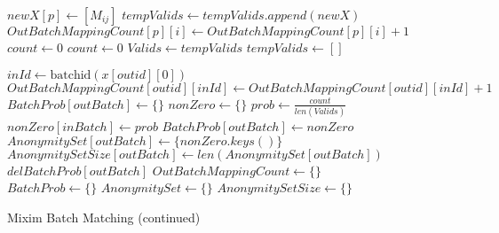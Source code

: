 \documentclass[twocolumn]{article}
\begin{document}
\begin{figure*}[p]
  \captionsetup{type=algorithm}
  \ContinuedFloat
  \caption{Mixim Batch Matching (continued)}
  \begin{algorithmic}[1]
                      \EndIf
                \EndFor
                    \State $newX [p] \gets  [M_{ij}] $
                    \State $ tempValids \gets tempValids.append(newX) $
                    \State $ OutBatchMappingCount[p][i] \gets OutBatchMappingCount[p][i] + 1 $
                    \State $count \gets 0$
                \Else
                    \State $count \gets 0$
                \EndIf
            \EndIf
        \EndFor
    \EndFor
    \State $ Valids \gets tempValids $
    \State $ tempValids \gets [] $
\EndIf

            \State $ inId \gets \text{batchid}(x[outid][0])$
            \State $ OutBatchMappingCount[outid][inId] \gets OutBatchMappingCount[outid][inId] + 1$
        \EndIf
    \EndFor
\EndFor
{}
        \State $ BatchProb[outBatch] \gets \{ \} $
    \EndIf
    \State $ nonZero \gets \{ \} $
        \State $ prob \gets \frac{count}{len(Valids)}$
            \State $ nonZero[inBatch] \gets prob $
        \EndIf
    \EndFor
        \State $ BatchProb[outBatch] \gets nonZero $
        \State $ AnonymitySet[outBatch] \gets \{ nonZero.keys() \} $
        \State $ AnonymitySetSize[outBatch] \gets len(AnonymitySet[outBatch]) $
    \Else
            \State $ del BatchProb[outBatch] $
        \EndIf
    \EndIf
\EndFor
\State $ OutBatchMappingCount \gets \{ \} $
\State $ BatchProb \gets \{ \} $
\State $ AnonymitySet \gets \{ \} $
\State $ AnonymitySetSize \gets \{ \} $
  \end{algorithmic}
\end{figure*}
\end{document}
